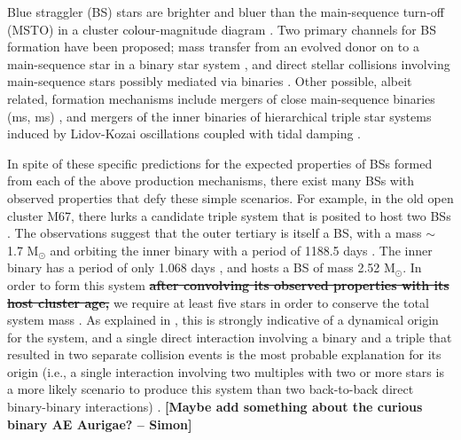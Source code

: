 \documentclass{aastex62}
\def\simon#1{{\bf {\color{red}[#1 -- Simon]}}}
\def\del#1{{\bf {\sout{#1}}}}
\begin{document}
Blue straggler (BS) stars are brighter and bluer than the
main-sequence turn-off (MSTO) in a cluster colour-magnitude diagram
\citep[e.g.][]{1953AJ.....58...61S,simunovic14,simunovic16}.  Two
primary channels for BS formation have been proposed; mass transfer
from an evolved donor on to a main-sequence star in a binary star
system
\citep[e.g.][]{mccrea64,1997A&A...328..143P,knigge09,mathieu09,leigh11,geller11,geller12,gosnell14,gosnell15},
and direct stellar collisions involving main-sequence stars possibly
mediated via binaries
\citep[e.g.][]{hills75,1997A&A...328..130P,shara97,leigh07,leigh11,leigh13,hypki13,2018arXiv181100058P}.
Other possible, albeit related, formation mechanisms include mergers
of close main-sequence binaries (ms, ms) \cite{2018arXiv181100058P},
and mergers of the inner binaries of hierarchical triple star systems
induced by Lidov-Kozai oscillations coupled with tidal damping
\citep[e.g.][]{perets09}.

In spite of these specific predictions for the expected properties of
BSs formed from each of the above production mechanisms, there exist
many BSs with observed properties that defy these simple scenarios.
For example, in the old open cluster M67, there lurks a candidate
triple system that is posited to host two BSs
\citep{vandenberg01,sandquist03}.  The observations suggest that the
outer tertiary is itself a BS, with a mass $\sim$ 1.7 M$_{\odot}$ and
orbiting the inner binary with a period of 1188.5 days
\citep{sandquist03}.  The inner binary has a period of only 1.068 days
\citep{vandenberg01}, and hosts a BS of mass 2.52 M$_{\odot}$.  In
order to form this system \del{after convolving its observed
  properties with its host cluster age,} we require at least five
stars in order to conserve the total system mass \citep{leigh11}.  As
explained in \citet{leigh11}, this is strongly indicative of a
dynamical origin for the system, and a single direct interaction
involving a binary and a triple that resulted in two separate
collision events is the most probable explanation for its origin
(i.e., a single interaction involving two multiples with two or more
stars is a more likely scenario to produce this system than two
back-to-back direct binary-binary interactions)
\citep{2004MNRAS.350..615G}.  \simon{Maybe add something about the
  curious binary AE Aurigae?}
\end{document}
